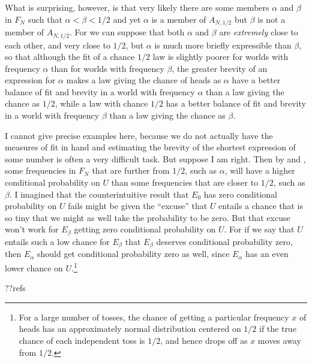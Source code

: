 What is surprising, however, is that very likely there are some members $\alpha$ and $\beta$ in $F_N$ such that $\alpha<\beta<1/2$
and yet $\alpha$ is a member of $A_{N,1/2}$ but $\beta$ is not a member of $A_{N,1/2}$. For we can suppose that both $\alpha$ and $\beta$
are \textit{extremely} close to each other, and very close to $1/2$, but $\alpha$ is much more briefly expressible than $\beta$, so that 
although the fit of a chance $1/2$ law is slightly poorer for worlds with frequency $\alpha$ than for worlds with frequency $\beta$,
the greater brevity of an expression for $\alpha$ makes a law giving the chance of heads as $\alpha$ have a better balance of fit and
brevity in a world with frequency $\alpha$ than a law giving the chance as $1/2$, while a law with chance $1/2$ has a better balance of fit and brevity in 
a world with frequency $\beta$ than a law giving the chance as $\beta$.

I cannot give precise examples here, because
we do not actually have the measures of fit in hand and estimating the brevity of the shortest expression of some number is often a very
difficult task. But suppose I am right. Then by  and , some frequencies in $F_N$ that are further from
$1/2$, such as $\alpha$, will have a higher conditional probability on $U$ than some frequencies that are closer to $1/2$, such as
$\beta$. I imagined that the counterintuitive result that $E_0$ has zero conditional probability on $U$ fails might be given the ``excuse''
that $U$ entails a chance that is so tiny that we might as well take the probability to be zero. But that excuse won't work for $E_\beta$
getting zero conditional probability on $U$. For if we say that $U$ entails such a low chance for $E_\beta$ that $E_\beta$ deserves
conditional probability zero, then $E_\alpha$ should get conditional probability zero as well, since $E_\alpha$ has an even lower chance
on $U$.\footnote{For a large number of tosses, the chance of getting a particular frequency $x$ of heads has an approximately normal distribution 
centered on $1/2$ if the true chance of each independent toss is $1/2$, and hence drops off as $x$ moves away from $1/2$.}

??refs

